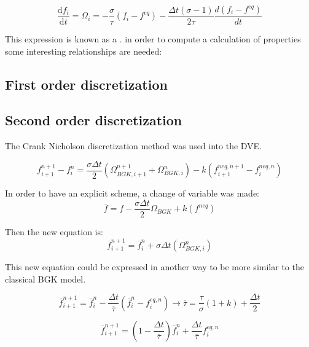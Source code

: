 \documentclass{article}
\begin{document}
\begin{equation}
    \frac{\mathrm{d} f_{i}}{\mathrm{d} t}=\Omega _{i}= -\frac{\sigma}{\tau}(f_i-f^{eq}) - \frac{\Delta t(\sigma-1)}{2\tau}\frac{d(f_i-f^{eq})}{dt} 
\end{equation}

This expression is known as a . in order to compute a calculation of properties some interesting relationships are needed:
\subsection{First order discretization}

\subsection{Second order discretization}
The Crank Nicholson discretization method was used into the DVE.

\begin{equation}
    f_{i+1}^{n+1} -f_{i}^{n} =\frac{\sigma\Delta t}{2}\left( \Omega _{BGK,i+1}^{n+1} +\Omega _{BGK,i}^{n}\right) -k\left( f_{i+1}^{neq,n+1} -f_{i}^{neq,n}\right)
\end{equation}

In order to have an explicit scheme, a change of variable was made:
\begin{equation}
    \overline{f} =f-\frac{\sigma\Delta t}{2}\Omega _{BGK} +k\left( f^{neq}\right)
\end{equation}

Then the new equation is:
\begin{equation}
    \overline{f}_{i+1}^{n+1} =\overline{f}_{i}^{n} +\sigma\Delta t\left( \Omega _{BGK,i}^{n}\right)
\end{equation}

This new equation could be expressed in another way to be more similar to the classical BGK model.

\begin{equation}
    \overline{f}_{i+1}^{n+1} =\overline{f}_{i}^{n} -\frac{\Delta t}{\overline{\tau }}\left(\overline{f}_{i}^{n} -f_{i}^{eq,n}\right)\rightarrow \overline{\tau } =\frac{\tau}{\sigma} ( 1+k) +\frac{\Delta t}{2}
\end{equation}

\begin{equation*}
    \overline{f}_{i+1}^{n+1} =(1-\frac{\Delta t}{\overline{\tau }})\overline{f}_{i}^{n} + \frac{\Delta t}{\overline{\tau }}f_{i}^{eq,n}
\end{equation*}
\end{document}
